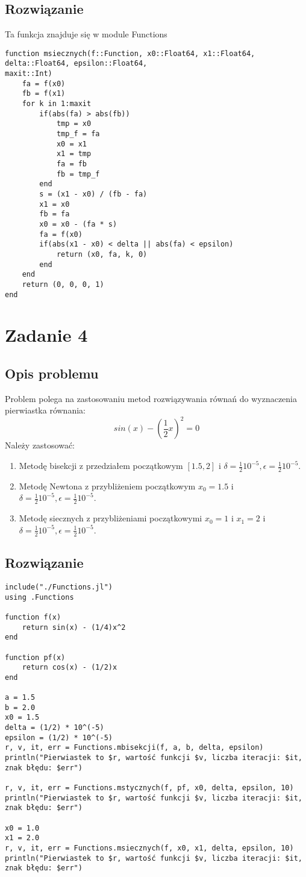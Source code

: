 \documentclass{article}
\begin{document}
\subsection{Rozwiązanie}
Ta funkcja znajduje się w module Functions
\begin{verbatim}
function msiecznych(f::Function, x0::Float64, x1::Float64, delta::Float64, epsilon::Float64, 
maxit::Int)
    fa = f(x0)
    fb = f(x1)
    for k in 1:maxit
        if(abs(fa) > abs(fb))
            tmp = x0
            tmp_f = fa
            x0 = x1
            x1 = tmp
            fa = fb
            fb = tmp_f
        end
        s = (x1 - x0) / (fb - fa)
        x1 = x0
        fb = fa
        x0 = x0 - (fa * s)
        fa = f(x0)
        if(abs(x1 - x0) < delta || abs(fa) < epsilon)
            return (x0, fa, k, 0)
        end
    end
    return (0, 0, 0, 1)
end
\end{verbatim}

\section{Zadanie 4}
\subsection{Opis problemu}
Problem polega na zastosowaniu metod rozwiązywania równań do wyznaczenia pierwiastka równania:
$$ sin(x) - (\frac{1}{2}x)^2 = 0$$
Należy zastosować:
\begin{enumerate}
    \item Metodę bisekcji z przedziałem początkowym $[1.5, 2]$ i $\delta = \frac{1}{2}10^{-5}, \epsilon = \frac{1}{2}10^{-5}$.
    \item Metodę Newtona z przybliżeniem początkowym $x_0 = 1.5$ i $\delta = \frac{1}{2}10^{-5}, \epsilon = \frac{1}{2}10^{-5}$.
    \item Metodę siecznych z przybliżeniami początkowymi $x_0 = 1$ i $x_1 = 2$ i $\delta = \frac{1}{2}10^{-5}, \epsilon = \frac{1}{2}10^{-5}$.
\end{enumerate}
\subsection{Rozwiązanie}
\begin{verbatim}
include("./Functions.jl")
using .Functions

function f(x)
    return sin(x) - (1/4)x^2
end

function pf(x)
    return cos(x) - (1/2)x
end

a = 1.5
b = 2.0
x0 = 1.5
delta = (1/2) * 10^(-5)
epsilon = (1/2) * 10^(-5)
r, v, it, err = Functions.mbisekcji(f, a, b, delta, epsilon)
println("Pierwiastek to $r, wartość funkcji $v, liczba iteracji: $it, znak błędu: $err")

r, v, it, err = Functions.mstycznych(f, pf, x0, delta, epsilon, 10)
println("Pierwiastek to $r, wartość funkcji $v, liczba iteracji: $it, znak błędu: $err")

x0 = 1.0
x1 = 2.0
r, v, it, err = Functions.msiecznych(f, x0, x1, delta, epsilon, 10)
println("Pierwiastek to $r, wartość funkcji $v, liczba iteracji: $it, znak błędu: $err")
\end{verbatim}
\end{document}
